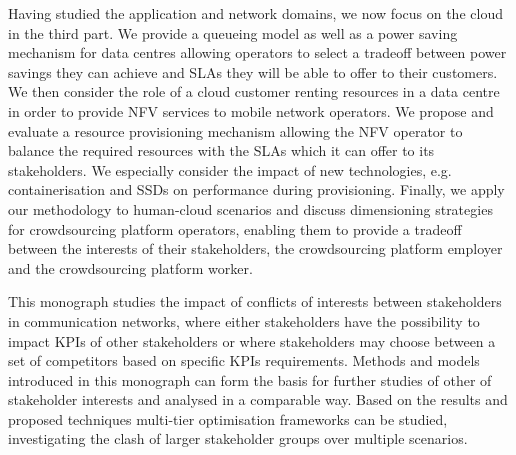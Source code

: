 Having studied the application and network domains, we now focus on the cloud in the third part.
We provide a queueing model as well as a power saving mechanism for data centres allowing operators to select a tradeoff between power savings they can achieve and \glspl{SLA} they will be able to offer to their customers.
We then consider the role of a cloud customer renting resources in a data centre in order to provide \gls{NFV} services to mobile network operators.
We propose and evaluate a resource provisioning mechanism allowing the \gls{NFV} operator to balance the required resources with the \glspl{SLA} which it can offer to its stakeholders. 
We especially consider the impact of new technologies, e.g. containerisation and \glspl{SSD} on performance during provisioning.
Finally, we apply our methodology to human-cloud scenarios and discuss dimensioning strategies for crowdsourcing platform operators, enabling them to provide a tradeoff between the interests of their stakeholders, the crowdsourcing platform employer and the crowdsourcing platform worker. 

This monograph studies the impact of conflicts of interests between stakeholders in communication networks, where either stakeholders have the possibility to impact \glspl{KPI} of other stakeholders or where stakeholders may choose between a set of competitors based on specific \glspl{KPI} requirements.
Methods and models introduced in this monograph can form the basis for further studies of other of stakeholder interests and analysed in a comparable way.
Based on the results and proposed techniques multi-tier optimisation frameworks can be studied, investigating the clash of larger stakeholder groups over multiple scenarios.